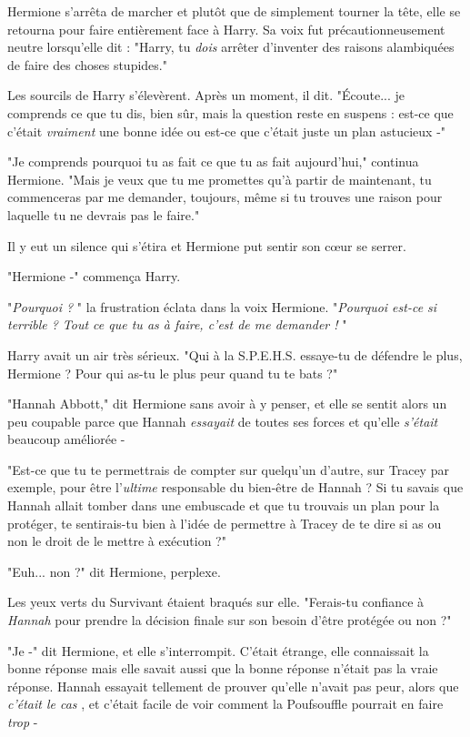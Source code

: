 Hermione s'arrêta de marcher et plutôt que de simplement tourner la tête, elle se retourna pour faire entièrement face à Harry. Sa voix fut précautionneusement neutre lorsqu'elle dit : "Harry, tu \emph{dois } arrêter d'inventer des raisons alambiquées de faire des choses stupides."

Les sourcils de Harry s'élevèrent. Après un moment, il dit. "Écoute... je comprends ce que tu dis, bien sûr, mais la question reste en suspens : est-ce que c'était \emph{vraiment } une bonne idée ou est-ce que c'était juste un plan astucieux -"

"Je comprends pourquoi tu as fait ce que tu as fait aujourd'hui," continua Hermione. "Mais je veux que tu me promettes qu'à partir de maintenant, tu commenceras par me demander, toujours, même si tu trouves une raison pour laquelle tu ne devrais pas le faire."

Il y eut un silence qui s'étira et Hermione put sentir son cœur se serrer.

"Hermione -" commença Harry.

"\emph{Pourquoi ?} " la frustration éclata dans la voix Hermione. "\emph{Pourquoi est-ce si terrible ? Tout ce que tu as à faire, c'est de me demander !} "

Harry avait un air très sérieux. "Qui à la S.P.E.H.S. essaye-tu de défendre le plus, Hermione ? Pour qui as-tu le plus peur quand tu te bats ?"

"Hannah Abbott," dit Hermione sans avoir à y penser, et elle se sentit alors un peu coupable parce que Hannah \emph{essayait}  de toutes ses forces et qu'elle \emph{s'était}  beaucoup améliorée -

"Est-ce que tu te permettrais de compter sur quelqu'un d'autre, sur Tracey par exemple, pour être l'\emph{ultime } responsable du bien-être de Hannah ? Si tu savais que Hannah allait tomber dans une embuscade et que tu trouvais un plan pour la protéger, te sentirais-tu bien à l'idée de permettre à Tracey de te dire si as ou non le droit de le mettre à exécution ?"

"Euh... non ?" dit Hermione, perplexe.

Les yeux verts du Survivant étaient braqués sur elle. "Ferais-tu confiance à \emph{Hannah } pour prendre la décision finale sur son besoin d'être protégée ou non ?"

"Je -" dit Hermione, et elle s'interrompit. C'était étrange, elle connaissait la bonne réponse mais elle savait aussi que la bonne réponse n'était pas la vraie réponse. Hannah essayait tellement de prouver qu'elle n'avait pas peur, alors que \emph{c'était le cas} , et c'était facile de voir comment la Poufsouffle pourrait en faire \emph{trop}  -

